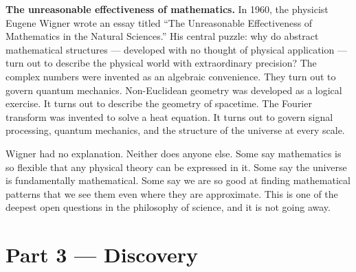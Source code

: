 \documentclass[12pt, a4paper]{article}
\newcounter{exercise}
\begin{document}
\begin{thought}
\textbf{The unreasonable effectiveness of mathematics.}
In 1960, the physicist Eugene Wigner wrote an essay titled ``The Unreasonable Effectiveness of Mathematics in the Natural Sciences.'' His central puzzle: why do abstract mathematical structures --- developed with no thought of physical application --- turn out to describe the physical world with extraordinary precision? The complex numbers were invented as an algebraic convenience. They turn out to govern quantum mechanics. Non-Euclidean geometry was developed as a logical exercise. It turns out to describe the geometry of spacetime. The Fourier transform was invented to solve a heat equation. It turns out to govern signal processing, quantum mechanics, and the structure of the universe at every scale.

Wigner had no explanation. Neither does anyone else. Some say mathematics is so flexible that any physical theory can be expressed in it. Some say the universe is fundamentally mathematical. Some say we are so good at finding mathematical patterns that we see them even where they are approximate. This is one of the deepest open questions in the philosophy of science, and it is not going away.
\end{thought}

\section{Part 3 \texorpdfstring{---}{--} Discovery}
\end{document}
